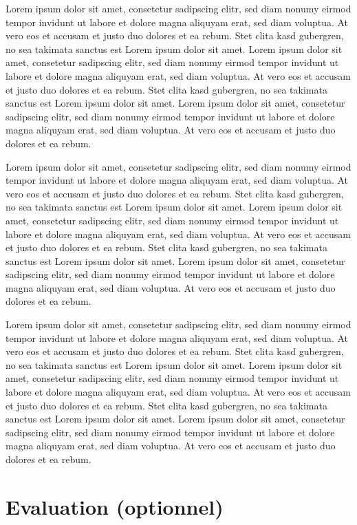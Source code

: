 \documentclass[preprint,journal]{vgtc}       %
\begin{document}
Lorem ipsum dolor sit amet, consetetur sadipscing elitr, sed diam
nonumy eirmod tempor invidunt ut labore et dolore magna aliquyam erat,
sed diam voluptua. At vero eos et accusam et justo duo dolores et ea
rebum. Stet clita kasd gubergren, no sea takimata sanctus est Lorem
ipsum dolor sit amet. Lorem ipsum dolor sit amet, consetetur
sadipscing elitr, sed diam nonumy eirmod tempor invidunt ut labore et
dolore magna aliquyam erat, sed diam voluptua. At vero eos et accusam
et justo duo dolores et ea rebum. Stet clita kasd gubergren, no sea
takimata sanctus est Lorem ipsum dolor sit amet. Lorem ipsum dolor sit
amet, consetetur sadipscing elitr, sed diam nonumy eirmod tempor
invidunt ut labore et dolore magna aliquyam erat, sed diam
voluptua. At vero eos et accusam et justo duo dolores et ea
rebum.

Lorem ipsum dolor sit amet, consetetur sadipscing elitr, sed diam
nonumy eirmod tempor invidunt ut labore et dolore magna aliquyam erat,
sed diam voluptua. At vero eos et accusam et justo duo dolores et ea
rebum. Stet clita kasd gubergren, no sea takimata sanctus est Lorem
ipsum dolor sit amet. Lorem ipsum dolor sit amet, consetetur
sadipscing elitr, sed diam nonumy eirmod tempor invidunt ut labore et
dolore magna aliquyam erat, sed diam voluptua. At vero eos et accusam
et justo duo dolores et ea rebum. Stet clita kasd gubergren, no sea
takimata sanctus est Lorem ipsum dolor sit amet. Lorem ipsum dolor sit
amet, consetetur sadipscing elitr, sed diam nonumy eirmod tempor
invidunt ut labore et dolore magna aliquyam erat, sed diam
voluptua. At vero eos et accusam et justo duo dolores et ea
rebum.

Lorem ipsum dolor sit amet, consetetur sadipscing elitr, sed diam
nonumy eirmod tempor invidunt ut labore et dolore magna aliquyam erat,
sed diam voluptua. At vero eos et accusam et justo duo dolores et ea
rebum. Stet clita kasd gubergren, no sea takimata sanctus est Lorem
ipsum dolor sit amet. Lorem ipsum dolor sit amet, consetetur
sadipscing elitr, sed diam nonumy eirmod tempor invidunt ut labore et
dolore magna aliquyam erat, sed diam voluptua. At vero eos et accusam
et justo duo dolores et ea rebum. Stet clita kasd gubergren, no sea
takimata sanctus est Lorem ipsum dolor sit amet. Lorem ipsum dolor sit
amet, consetetur sadipscing elitr, sed diam nonumy eirmod tempor
invidunt ut labore et dolore magna aliquyam erat, sed diam
voluptua. At vero eos et accusam et justo duo dolores et ea
rebum.

\newpage

\section{Evaluation (optionnel)}
\end{document}
